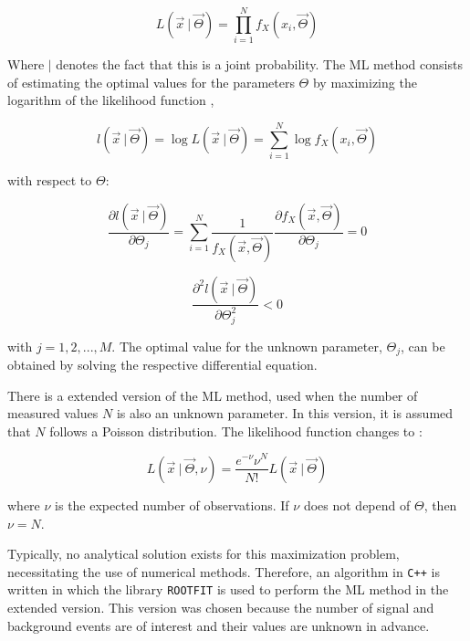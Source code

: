 \begin{equation}
L(\vec{x} \ | \ \vec{\Theta}) = \prod_{i = 1}^{N} f_X(x_i, \vec{\Theta}) 
\end{equation}

Where $|$ denotes the fact that this is a joint probability. The ML method consists of estimating the optimal values for the parameters $\Theta$ by maximizing the logarithm of the likelihood function \cite{mejia2012medida},

\begin{equation}
	l(\vec{x} \ | \ \vec{\Theta}) = \log L(\vec{x} \ | \ \vec{\Theta}) = \sum_{i = 1}^{N} \log f_X(x_i, \vec{\Theta})
\end{equation} 

with respect to $\Theta$:

\begin{equation}
	\frac{\partial{l(\vec{x} \ | \ \vec{\Theta})}}{\partial \Theta_j} = \sum_{i = 1}^{N} \frac{1}{f_X(\vec{x}, \vec{\Theta})} \frac{\partial{f_X(\vec{x}, \vec{\Theta})}}{\partial \Theta_j} = 0
\end{equation} 

\begin{equation}
	\frac{\partial^2{l(\vec{x} \ | \ \vec{\Theta})}}{\partial \Theta_j ^2} < 0
	\label{eq:ml}
\end{equation}

with $ j = 1, 2, ..., M$. The optimal value for the unknown parameter, $\Theta_j$, can be obtained by solving the respective differential equation.

There is a extended version of the ML method, used when the number of measured values $N$ is also an unknown parameter. In this version, it is assumed that $N$ follows a Poisson distribution. The likelihood function changes to \cite{bonanomi2021response}:

\begin{equation}
	L(\vec{x} \ | \ \vec{\Theta}, \nu) = \frac{e^{-\nu} \nu^N}{N!} L(\vec{x} \ | \ \vec{\Theta})
\end{equation}

where $\nu$ is the expected number of observations. 
If $\nu$ does not depend of $\Theta$, then $\nu = N$. 

Typically, no analytical solution exists for this maximization problem, necessitating the use of numerical methods. Therefore, an algorithm in \verb|C++| is written in which the library \verb|ROOTFIT| is used to perform the ML method in the extended version. This version was chosen because the number of signal and background events are of interest and their values are unknown in advance.

